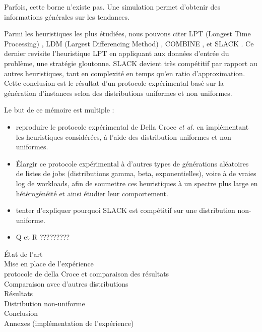 \documentclass[a4paper,12pt]{report}
\theoremstyle{plain}				%
\theoremstyle{definition}				%
\newcommand{\fco}[1]{\todo[author=FCO,color=teal,inline]{#1}}
\begin{document}
  Parfois, cette borne n'existe pas. Une simulation permet d'obtenir des 
  informations générales sur les tendances.

\bigskip
Parmi les heuristiques les plus étudiées, nous pouvons citer 
  LPT (Longest Time Processing) \cite{graham1966bounds}, 
  LDM (Largest Differencing Method) \cite{karmarkar1982differencing}, 
  COMBINE \cite{lee1988multiprocessor}, et 
  SLACK \cite{della2020longest}.
Ce dernier revisite l'heuristique LPT en appliquant aux données d'entrée du problème, 
  une stratégie gloutonne. 
SLACK devient très compétitif par rapport au autres heuristiques, 
  tant en complexité en temps 
  qu'en ratio d'approximation. 
Cette conclusion est le résultat d'un protocole expérimental 
  basé sur la génération d'instances selon des 
  distributions uniformes et non uniformes.  

Le but de ce mémoire est multiple :
\begin{itemize}
\item reproduire le protocole expérimental de Della Croce \emph{et al.} 
  en implémentant les heuristiques considérées, 
  à l'aide des distribution uniformes et non-uniformes.
\item Élargir ce protocole expérimental à 
  d'autres types de générations aléatoires 
  de listes de jobs (distributions gamma, beta, exponentielles), voire 
  à de vraies log de workloads, 
  afin de soumettre ces heuristiques à un spectre plus large en 
  hétérogénéité et ainsi étudier leur comportement.    
\item tenter d'expliquer pourquoi SLACK est 
  compétitif sur une distribution non-uniforme. 
\item Q et R ?????????
\end{itemize} 

\bigskip
\fco{...Plan une fois terminé...}
État de l'art\\
Mise en place de l'expérience\\
protocole de della Croce et comparaison des résultats\\
Comparaison avec d'autres distributions\\
Résultats\\
Distribution non-uniforme\\
Conclusion \\
Annexes (implémentation de l'expérience)
\end{document}

